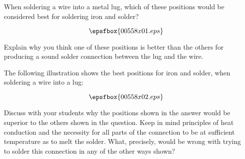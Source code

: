

When soldering a wire into a metal lug, which of these positions would be considered best for soldering iron and solder?

$$\epsfbox{00558x01.eps}$$

Explain why you think one of these positions is better than the others for producing a sound solder connection between the lug and the wire.







The following illustration shows the best positions for iron and solder, when soldering a wire into a lug:

$$\epsfbox{00558x02.eps}$$







Discuss with your students why the positions shown in the answer would be superior to the others shown in the question.  Keep in mind principles of heat conduction and the necessity for all parts of the connection to be at sufficient temperature as to melt the solder.  What, precisely, would be wrong with trying to solder this connection in any of the other ways shown?




